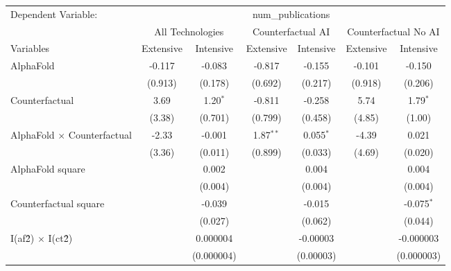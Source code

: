 \begingroup
\centering
\begin{tabular}{lcccccc}
   \tabularnewline \midrule \midrule
   Dependent Variable: & \multicolumn{6}{c}{num\_publications}\\
 & \multicolumn{2}{c}{All Technologies} & \multicolumn{2}{c}{Counterfactual AI} & \multicolumn{2}{c}{Counterfactual No AI} \\
\cmidrule(lr){1-1}\cmidrule(lr){2-3} \cmidrule(lr){4-5} \cmidrule(lr){6-7}
Variables & \multicolumn{1}{c}{Extensive} & \multicolumn{1}{c}{Intensive} & \multicolumn{1}{c}{Extensive} & \multicolumn{1}{c}{Intensive} & \multicolumn{1}{c}{Extensive} & \multicolumn{1}{c}{Intensive} \\
\cmidrule(lr){1-1}\cmidrule(lr){2-2} \cmidrule(lr){3-3} \cmidrule(lr){4-4} \cmidrule(lr){5-5} \cmidrule(lr){6-6} \cmidrule(lr){7-7}
   AlphaFold                          & -0.117  & -0.083     & -0.817      & -0.155      & -0.101  & -0.150\\   
                                      & (0.913) & (0.178)    & (0.692)     & (0.217)     & (0.918) & (0.206)\\   
   Counterfactual                     & 3.69    & 1.20$^{*}$ & -0.811      & -0.258      & 5.74    & 1.79$^{*}$\\   
                                      & (3.38)  & (0.701)    & (0.799)     & (0.458)     & (4.85)  & (1.00)\\   
   AlphaFold $\times$ Counterfactual  & -2.33   & -0.001     & 1.87$^{**}$ & 0.055$^{*}$ & -4.39   & 0.021\\   
                                      & (3.36)  & (0.011)    & (0.899)     & (0.033)     & (4.69)  & (0.020)\\   
   AlphaFold square                   &         & 0.002      &             & 0.004       &         & 0.004\\   
                                      &         & (0.004)    &             & (0.004)     &         & (0.004)\\   
   Counterfactual square              &         & -0.039     &             & -0.015      &         & -0.075$^{*}$\\   
                                      &         & (0.027)    &             & (0.062)     &         & (0.044)\\   
   I(af\^2) $\times$ I(ct\^2)         &         & 0.000004   &             & -0.00003    &         & -0.000003\\   
                                      &         & (0.000004) &             & (0.00003)   &         & (0.000003)\\   

\end{tabular}
